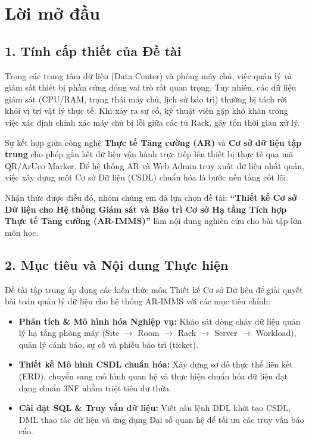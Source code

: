 \chapter*{Lời mở đầu}
\pagestyle{plain}
\enlargethispage{3\baselineskip}

\section*{1. Tính cấp thiết của Đề tài}
Trong các trung tâm dữ liệu (Data Center) và phòng máy chủ, việc quản lý và giám sát thiết bị phần cứng đóng vai trò rất quan trọng. Tuy nhiên, các dữ liệu giám sát (CPU/RAM, trạng thái máy chủ, lịch sử bảo trì) thường bị tách rời khỏi vị trí vật lý thực tế. Khi xảy ra sự cố, kỹ thuật viên gặp khó khăn trong việc xác định chính xác máy chủ bị lỗi giữa các tủ Rack, gây tốn thời gian xử lý.

Sự kết hợp giữa công nghệ \textbf{Thực tế Tăng cường (AR)} và \textbf{Cơ sở dữ liệu tập trung} cho phép gắn kết dữ liệu vận hành trực tiếp lên thiết bị thực tế qua mã QR/ArUco Marker. Để hệ thống AR và Web Admin truy xuất dữ liệu nhất quán, việc xây dựng một Cơ sở Dữ liệu (CSDL) chuẩn hóa là bước nền tảng cốt lõi.

Nhận thức được điều đó, nhóm chúng em đã lựa chọn đề tài: \textbf{“Thiết kế Cơ sở Dữ liệu cho Hệ thống Giám sát và Bảo trì Cơ sở Hạ tầng Tích hợp Thực tế Tăng cường (AR-IMMS)”} làm nội dung nghiên cứu cho bài tập lớn môn học.

\section*{2. Mục tiêu và Nội dung Thực hiện}
Đề tài tập trung áp dụng các kiến thức môn Thiết kế Cơ sở Dữ liệu để giải quyết bài toán quản lý dữ liệu cho hệ thống AR-IMMS với các mục tiêu chính:
\begin{itemize}
    \item \textbf{Phân tích \& Mô hình hóa Nghiệp vụ:} Khảo sát dòng chảy dữ liệu quản lý hạ tầng phòng máy (Site $\rightarrow$ Room $\rightarrow$ Rack $\rightarrow$ Server $\rightarrow$ Workload), quản lý cảnh báo, sự cố và phiếu bảo trì (ticket).
    \item \textbf{Thiết kế Mô hình CSDL chuẩn hóa:} Xây dựng sơ đồ thực thể liên kết (ERD), chuyển sang mô hình quan hệ và thực hiện chuẩn hóa dữ liệu đạt dạng chuẩn 3NF nhằm triệt tiêu dư thừa.
    \item \textbf{Cài đặt SQL \& Truy vấn dữ liệu:} Viết câu lệnh DDL khởi tạo CSDL, DML thao tác dữ liệu và ứng dụng Đại số quan hệ để tối ưu các truy vấn báo cáo.
\end{itemize}

